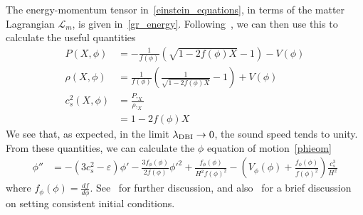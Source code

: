 The energy-momentum tensor in~\eqref{einstein_equations}, in terms of the matter Lagrangian $\mathcal{L}_m$,
is given in~\eqref{gr_energy}.
    Following~\cite{Christopherson_2009, mukhanov_1999},
    we can then use this to calculate the useful quantities
    \begin{align}
        P(X, \phi) &= -\frac{1}{f(\phi)}\left(\sqrt{1-2f(\phi)X}-1\right)-V(\phi)\\
        \rho(X, \phi) &= \frac{1}{f(\phi)}\left(\frac{1}{\sqrt{1-2f(\phi)X}}-1\right)+V(\phi)\\
        c^2_s(X, \phi) &= \frac{P,_X}{\rho,_X}\\
                    &= 1-2f(\phi)X
    \end{align}
    We see that, as expected, in the limit $\lambda_{\text{DBI}}\rightarrow 0$, the sound
    speed tends to unity.
    From these quantities, we can calculate the $\phi$ equation of motion~\eqref{phieom}
    \begin{align}
        \phi'' &= -(3c_s^2-\varepsilon)\phi'
                -\frac{3f_\phi(\phi)}{2f(\phi)}\phi'^2
                +\frac{f_\phi(\phi)}{H^2f(\phi)^2}
                -\left(V_\phi(\phi)+\frac{f_\phi(\phi)}{f(\phi)^2}\right)\frac{c_s^3}{H^2}
    \end{align}
    where $f_\phi(\phi) = \frac{df}{d\phi}$.
    See~\cite{dbi_silverstein, warp_features_dbi} for further discussion,
    and also~\cite{cmb_pol_ics} for a brief discussion on setting consistent initial conditions.


